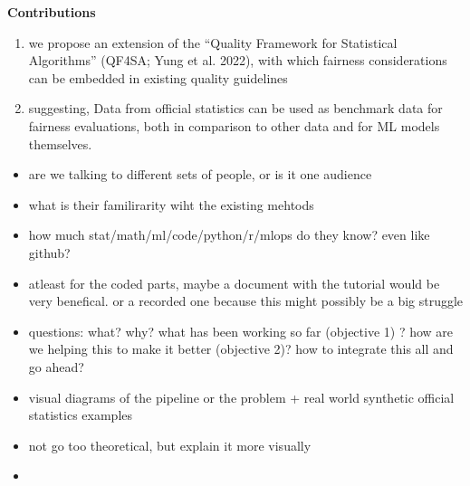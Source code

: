 \documentclass[a4paper,12pt]{article}
\begin{document}
\textbf{Contributions}
\begin{enumerate}[label=C\arabic*:, leftmargin=1cm]
    \item we propose an extension of the “Quality Framework for Statistical Algorithms” (QF4SA; Yung et al. 2022), with which fairness considerations can be embedded in existing quality guidelines
    \item suggesting, Data from official statistics can be used as benchmark data for fairness evaluations, both in comparison to other data and for ML models themselves.
    
\end{enumerate}


\begin{itemize}
    \item are we talking to different sets of people, or is it one audience
    \item what is their familirarity wiht the existing mehtods 
    \item how much stat/math/ml/code/python/r/mlops do they know? even like github?
    \item atleast for the coded parts, maybe a document with the tutorial would be very benefical. or a recorded one because this might possibly be a big struggle
    \item questions: what? why? what has been working so far (objective 1) ? how are we helping this to make it better (objective 2)? how to integrate this all and go ahead? 
    \item visual diagrams of the pipeline or the problem + real world synthetic official statistics examples
    \item not go too theoretical, but explain it more visually 
    \item 
\end{itemize}
\end{document}
